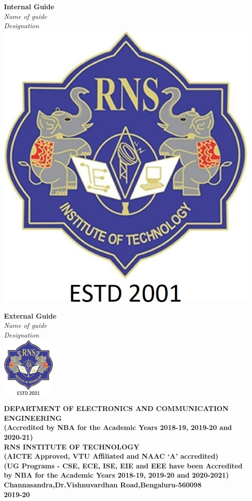 \begin{titlingpage}
	\begin{minipage}[t]{0.6\textwidth}%
		\Large\textbf{Internal Guide}\\
		\large\textit{\color{blue}Name of guide}\\
		\large\textit{\color{blue}Designation}\\
		
		\includegraphics[height=3 cm]{images/rns1.jpg}
	\end{minipage}\hspace{0.06cm}
	\begin{minipage}[t]{0.3\textwidth}%
		\Large\textbf{External Guide}\\
		\large\textit{\color{blue}Name of guide}\\
		\large\textit{\color{blue}Designation}\\
		
		\centering\includegraphics[height=3cm]{images/rns1.jpg}\\
	\end{minipage}
	
	
	
	\begin{center}
		\vspace{0.5cm}
		\scriptsize\textbf{\color{blue}DEPARTMENT OF ELECTRONICS AND COMMUNICATION ENGINEERING\\
			\small(Accredited by NBA for the Academic Years 2018-19, 2019-20 and 2020-21)}\\
		\vspace{0.5cm}
		\small\textbf{\color{blue}RNS INSTITUTE OF TECHNOLOGY\\
			(AICTE Approved, VTU Affiliated and NAAC `A' accredited)\\
			(UG Programs - CSE, ECE, ISE, EIE and EEE have been Accredited by NBA for the Academic Years 2018-19, 2019-20 and 2020-2021)\\
			Channasandra,Dr.Vishnuvardhan Road,Bengaluru-560098\\
			\vspace{0.5cm}
			2019-20}
	\end{center}
\end{titlingpage}
